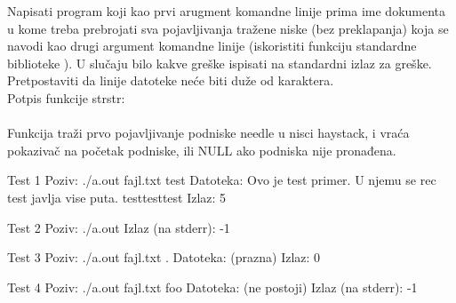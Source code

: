 \begin{Exercise}[label=904]

 Napisati program koji kao prvi arugment komandne linije prima ime dokumenta u kome treba prebrojati sva pojavljivanja tražene niske (bez preklapanja) koja se navodi kao drugi argument komandne linije (iskoristiti funkciju standardne biblioteke ). U slučaju
  bilo kakve greške ispisati  na standardni izlaz za greške.
  Pretpostaviti da linije datoteke neće biti duže od 
  karaktera.\\
  Potpis funkcije strstr:\\
  \\
  Funkcija traži prvo pojavljivanje podniske needle u nisci
  haystack, i vraća pokazivač na početak podniske, ili
  NULL ako podniska nije pronađena.

\begin{minitest}
\begin{test}{Test 1}
Poziv:  ./a.out fajl.txt test          
Datoteka:   Ovo je test primer.     
        U njemu se rec test javlja
        vise puta. testtesttest
Izlaz:  5                       
\end{test}
\end{minitest}
\begin{minitest}
\begin{test}{Test 2}
Poziv:   ./a.out      
Izlaz  (na stderr):  -1       
\end{test}
\end{minitest}


\begin{minitest}
\begin{test}{Test 3}
Poziv:  ./a.out fajl.txt .    
Datoteka:   (prazna)      
Izlaz:    0                 
\end{test}
\end{minitest}
\begin{minitest}
\begin{test}{Test 4}
Poziv:   ./a.out fajl.txt foo
Datoteka:   (ne postoji)      
Izlaz (na stderr):    -1                 
\end{test}
\end{minitest}


\end{Exercise}
\begin{Answer}[ref=904]
\end{Answer}


